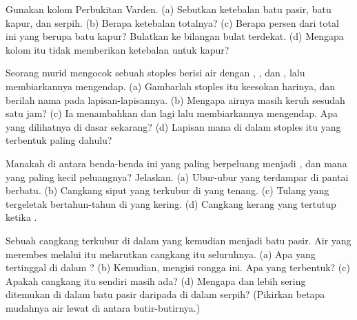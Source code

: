 \begin{exercise}[$\star\star$]\label{exo:g7:sediments-and-fossils:5}
Gunakan kolom Perbukitan Varden. (a) Sebutkan ketebalan batu pasir, batu
kapur, dan serpih. (b) Berapa ketebalan totalnya? (c) Berapa persen dari
total ini yang berupa batu kapur? Bulatkan ke bilangan bulat terdekat.
(d) Mengapa kolom itu tidak memberikan ketebalan untuk kapur?
\end{exercise}

\begin{exercise}[$\star\star$]\label{exo:g7:sediments-and-fossils:6}
Seorang murid mengocok sebuah stoples berisi air dengan , , dan
, lalu membiarkannya mengendap. (a) Gambarlah stoples itu keesokan
harinya, dan berilah nama pada lapisan-lapisannya. (b) Mengapa airnya masih
keruh sesudah satu jam? (c) Ia menambahkan  dan  lagi lalu
membiarkannya mengendap. Apa yang dilihatnya di dasar sekarang? (d) Lapisan
mana di dalam stoples itu yang terbentuk paling dahulu?
\end{exercise}

\begin{exercise}[$\star\star$]\label{exo:g7:sediments-and-fossils:7}
Manakah di antara benda-benda ini yang paling berpeluang menjadi , dan
mana yang paling kecil peluangnya? Jelaskan. (a) Ubur-ubur yang terdampar
di pantai berbatu. (b) Cangkang siput yang terkubur di   yang
tenang. (c) Tulang yang tergeletak bertahun-tahun di  yang kering.
(d) Cangkang kerang yang tertutup  ketika  .
\end{exercise}

\begin{exercise}[$\star\star$]\label{exo:g7:sediments-and-fossils:8}
Sebuah cangkang terkubur di dalam  yang kemudian menjadi batu pasir.
Air yang merembes melalui  itu melarutkan cangkang itu seluruhnya.
(a) Apa yang tertinggal di dalam ? (b) Kemudian,  mengisi
rongga ini. Apa yang terbentuk? (c) Apakah cangkang itu sendiri masih ada?
(d) Mengapa  dan  lebih sering ditemukan di dalam batu pasir
daripada di dalam serpih? (Pikirkan betapa mudahnya air lewat di antara
butir-butirnya.)
\end{exercise}


